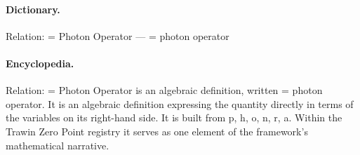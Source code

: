 \paragraph{Dictionary.}
Relation: = Photon Operator — = photon operator

\paragraph{Encyclopedia.}
Relation: = Photon Operator is an algebraic definition, written = photon operator. It is an algebraic definition expressing the quantity directly in terms of the variables on its right-hand side. It is built from p, h, o, n, r, a. Within the Trawin Zero Point registry it serves as one element of the framework's mathematical narrative.

